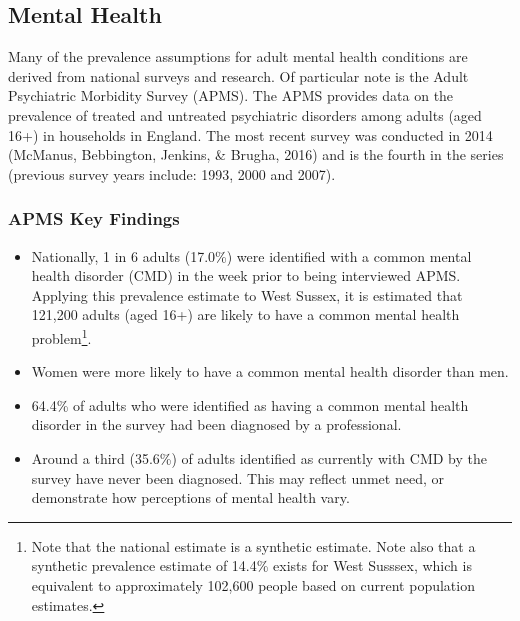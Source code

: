 

\clearpage

\subsection{Mental Health}
Many of the prevalence assumptions for adult mental health conditions are derived from national surveys and research. Of particular note is the Adult Psychiatric Morbidity Survey (APMS). The APMS provides data on the prevalence of treated and untreated psychiatric disorders among adults (aged 16+) in households in England. The most recent survey was conducted in 2014 (McManus, Bebbington, Jenkins, \& Brugha, 2016) and is the fourth in the series (previous survey years include: 1993, 2000 and 2007).

\subsubsection{APMS Key Findings}
\begin{itemize}[noitemsep]
    \item Nationally, 1 in 6 adults (17.0\%) were identified with a common mental health disorder (CMD) in the week prior to being interviewed APMS. Applying this prevalence estimate to West Sussex, it is estimated that 121,200 adults (aged 16+) are likely to have a common mental health problem\footnote{Note that the national estimate is a synthetic estimate. Note also that a synthetic prevalence estimate of 14.4\% exists for West Susssex, which is equivalent to approximately 102,600 people based on current population estimates.}.
    \item Women were more likely to have a common mental health disorder than men.
    \item 64.4\% of adults who were identified as having a common mental health disorder in the survey had been diagnosed by a professional.
    \item Around a third (35.6\%) of adults identified as currently with CMD by the survey have never been diagnosed. This may reflect unmet need, or demonstrate how perceptions of mental health vary.
\end{itemize}

